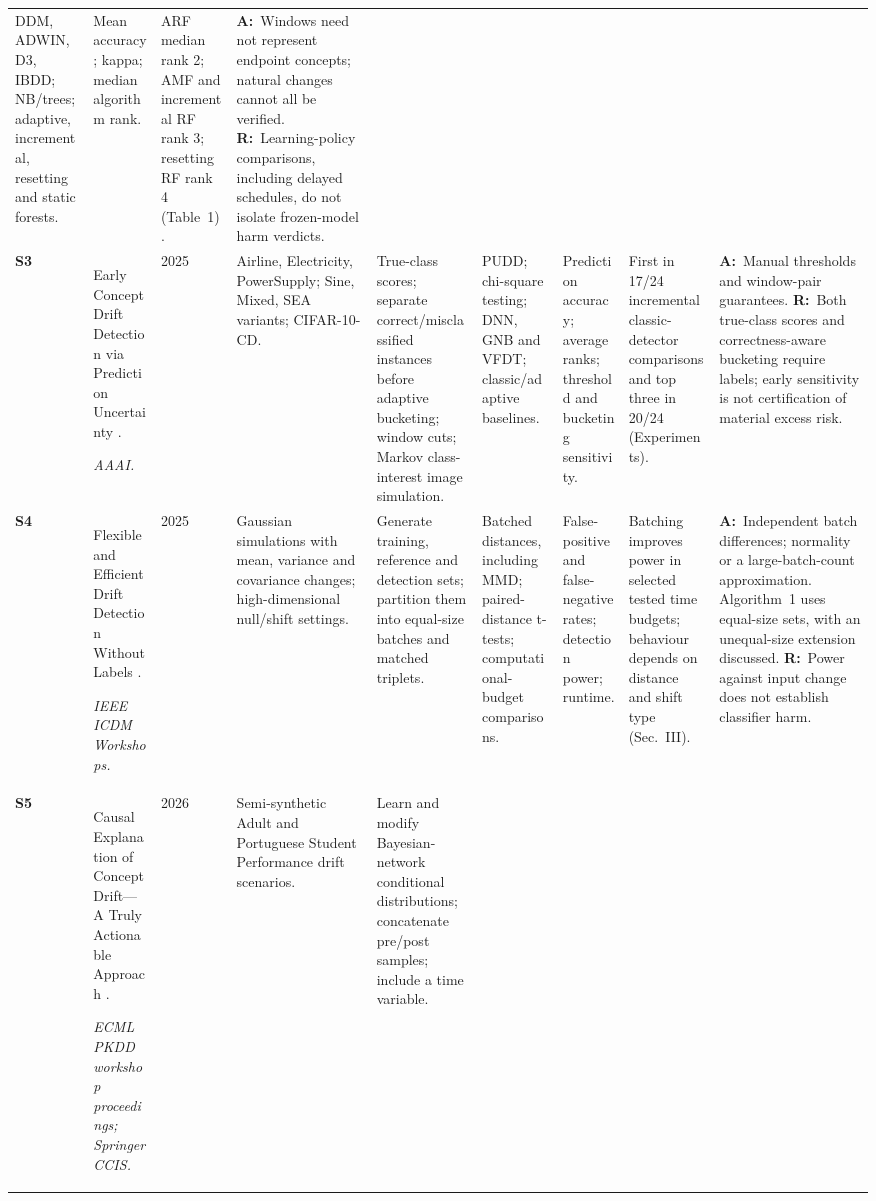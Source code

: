 \documentclass[11pt,a4paper]{article}
\newcommand{\A}{\textbf{A:}\ }
\newcommand{\R}{\textbf{R:}\ }
\begin{document}
\begin{landscape}
\begin{longtable}{L{0.65cm}L{4.0cm}L{0.85cm}L{2.9cm}L{2.8cm}L{2.8cm}L{2.4cm}L{3.0cm}L{4.2cm}}
DDM, ADWIN, D3, IBDD; NB/trees; adaptive, incremental, resetting and static forests. &
Mean accuracy; kappa; median algorithm rank. &
ARF median rank 2; AMF and incremental RF rank 3; resetting RF rank 4 (Table~1). &
\A Windows need not represent endpoint concepts; natural changes cannot all be verified.
\R Learning-policy comparisons, including delayed schedules, do not isolate frozen-model harm verdicts.\\
\addlinespace[5pt]
\textbf{S3} &
Early Concept Drift Detection via Prediction Uncertainty \cite{pudd}.
\par\emph{AAAI.} &
2025 &
Airline, Electricity, PowerSupply; Sine, Mixed, SEA variants; CIFAR-10-CD. &
True-class scores; separate correct/misclassified instances before adaptive bucketing; window cuts; Markov class-interest image simulation. &
PUDD; chi-square testing; DNN, GNB and VFDT; classic/adaptive baselines. &
Prediction accuracy; average ranks; threshold and bucketing sensitivity. &
First in 17/24 incremental classic-detector comparisons and top three in 20/24 (Experiments). &
\A Manual thresholds and window-pair guarantees.
\R Both true-class scores and correctness-aware bucketing require labels; early sensitivity is not certification of material excess risk.\\
\addlinespace[5pt]
\textbf{S4} &
Flexible and Efficient Drift Detection Without Labels \cite{batched}.
\par\emph{IEEE ICDM Workshops.} &
2025 &
Gaussian simulations with mean, variance and covariance changes; high-dimensional null/shift settings. &
Generate training, reference and detection sets; partition them into equal-size batches and matched triplets. &
Batched distances, including MMD; paired-distance t-tests; computational-budget comparisons. &
False-positive and false-negative rates; detection power; runtime. &
Batching improves power in selected tested time budgets; behaviour depends on distance and shift type (Sec.~III). &
\A Independent batch differences; normality or a large-batch-count approximation. Algorithm~1 uses equal-size sets, with an unequal-size extension discussed.
\R Power against input change does not establish classifier harm.\\
\addlinespace[5pt]
\textbf{S5} &
Causal Explanation of Concept Drift---A Truly Actionable Approach \cite{causal}.
\par\emph{ECML PKDD workshop proceedings; Springer CCIS.} &
2026 &
Semi-synthetic Adult and Portuguese Student Performance drift scenarios. &
Learn and modify Bayesian-network conditional distributions; concatenate pre/post samples; include a time variable. &

\end{longtable}
\end{landscape}
\end{document}
